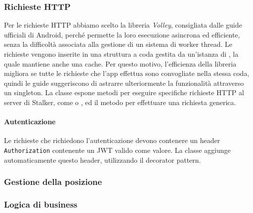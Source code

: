 \documentclass[../../manuale-manutentore.tex]{subfiles}
\begin{document}
\subsubsection{Richieste HTTP}%
\label{subs:richieste_http}

Per le richieste HTTP abbiamo scelto la libreria \textit{Volley}, consigliata dalle guide ufficiali di Android, perché permette la loro esecuzione asincrona ed efficiente, senza la difficoltà associata alla gestione di un sistema di worker thread.
Le richieste vengono inserite in una struttura a coda gestita da un'istanza di , la quale mantiene anche una cache.
Per questo motivo, l'efficienza della libreria migliora se tutte le richieste che l'app effettua sono convogliate nella stessa coda, quindi le guide suggeriscono di astrarre ulteriormente la funzionalità attraverso un singleton.
La classe  espone metodi per eseguire specifiche richieste HTTP al server di Stalker, come  o , ed il metodo  per effettuare una richiesta generica.

\paragraph{Autenticazione}%
\label{par:autenticazione}

Le richieste che richiedono l'autenticazione devono contenere un header \texttt{Authorization} contenente un JWT valido come valore.
La classe  aggiunge automaticamente questo header, utilizzando il decorator pattern.

\subsubsection{Gestione della posizione}%
\label{subs:gestione_della_posizione}

\subsubsection{Logica di business}%
\label{subs:logica_di_business}
\end{document}
